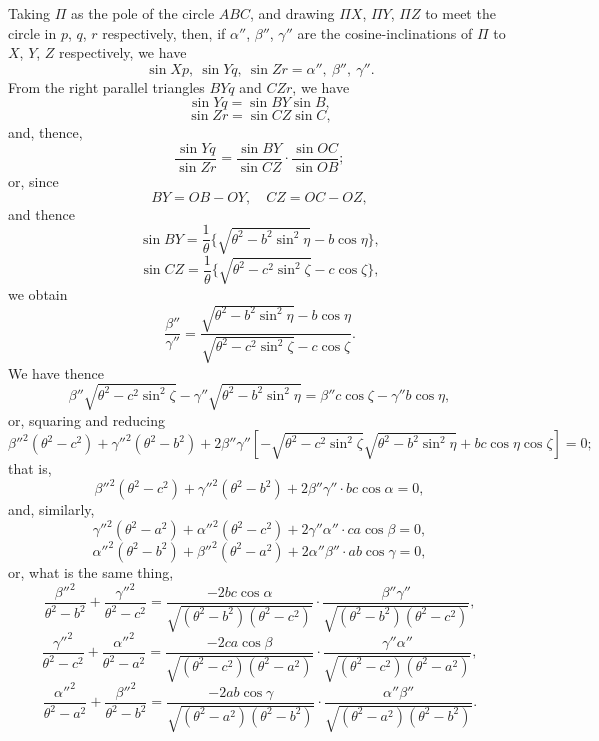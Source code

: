 \documentclass[11pt,a4paper]{article}
\begin{document}
Taking $\Pi$ as the pole of the circle $ABC$, and drawing $\Pi X$, $\Pi Y$, $\Pi Z$ to meet the circle in $p$, $q$, $r$ respectively, then, if $\alpha''$, $\beta''$, $\gamma''$ are the cosine-inclinations of $\Pi$ to $X$, $Y$, $Z$ respectively, we have
\[
\sin Xp,\ \sin Yq,\ \sin Zr = \alpha'',\ \beta'',\ \gamma''.
\]
From the right parallel triangles $BYq$ and $CZr$, we have
\[
\sin Yq = \sin BY\sin B,
\]
\[
\sin Zr = \sin CZ\sin C,
\]
and, thence,
\[
\frac{\sin Yq}{\sin Zr} = \frac{\sin BY}{\sin CZ} \cdot \frac{\sin OC}{\sin OB};
\]
or, since
\[
BY = OB - OY,\quad CZ = OC - OZ,
\]
and thence
\[
\sin BY = \frac{1}{\theta}\{\sqrt{\theta^{2} - b^{2}\sin^{2}\eta} - b\cos\eta\},
\]
\[
\sin CZ = \frac{1}{\theta}\{\sqrt{\theta^{2} - c^{2}\sin^{2}\zeta} - c\cos\zeta\},
\]
we obtain
\[
\frac{\beta''}{\gamma''} = \frac{\sqrt{\theta^{2} - b^{2}\sin^{2}\eta} - b\cos\eta}{\sqrt{\theta^{2} - c^{2}\sin^{2}\zeta} - c\cos\zeta}.
\]
We have thence
\[
\beta''\sqrt{\theta^{2} - c^{2}\sin^{2}\zeta} - \gamma''\sqrt{\theta^{2} - b^{2}\sin^{2}\eta} = \beta''c\cos\zeta - \gamma''b\cos\eta,
\]
or, squaring and reducing
\[
\beta''^{2}(\theta^{2} - c^{2}) + \gamma''^{2}(\theta^{2} - b^{2}) + 2\beta''\gamma''\left[-\sqrt{\theta^{2} - c^{2}\sin^{2}\zeta}\sqrt{\theta^{2} - b^{2}\sin^{2}\eta} + bc\cos\eta\cos\zeta\right] = 0;
\]
that is,
\[
\beta''^{2}(\theta^{2} - c^{2}) + \gamma''^{2}(\theta^{2} - b^{2}) + 2\beta''\gamma'' \cdot bc\cos\alpha = 0,
\]
and, similarly,
\[
\gamma''^{2}(\theta^{2} - a^{2}) + \alpha''^{2}(\theta^{2} - c^{2}) + 2\gamma''\alpha'' \cdot ca\cos\beta = 0,
\]
\[
\alpha''^{2}(\theta^{2} - b^{2}) + \beta''^{2}(\theta^{2} - a^{2}) + 2\alpha''\beta'' \cdot ab\cos\gamma = 0,
\]
or, what is the same thing,
\[
\frac{\beta''^{2}}{\theta^{2} - b^{2}} + \frac{\gamma''^{2}}{\theta^{2} - c^{2}} = \frac{-2bc\cos\alpha}{\sqrt{(\theta^{2} - b^{2})(\theta^{2} - c^{2})}} \cdot \frac{\beta''\gamma''}{\sqrt{(\theta^{2} - b^{2})(\theta^{2} - c^{2})}},
\]
\[
\frac{\gamma''^{2}}{\theta^{2} - c^{2}} + \frac{\alpha''^{2}}{\theta^{2} - a^{2}} = \frac{-2ca\cos\beta}{\sqrt{(\theta^{2} - c^{2})(\theta^{2} - a^{2})}} \cdot \frac{\gamma''\alpha''}{\sqrt{(\theta^{2} - c^{2})(\theta^{2} - a^{2})}},
\]
\[
\frac{\alpha''^{2}}{\theta^{2} - a^{2}} + \frac{\beta''^{2}}{\theta^{2} - b^{2}} = \frac{-2ab\cos\gamma}{\sqrt{(\theta^{2} - a^{2})(\theta^{2} - b^{2})}} \cdot \frac{\alpha''\beta''}{\sqrt{(\theta^{2} - a^{2})(\theta^{2} - b^{2})}}.
\]
\end{document}
